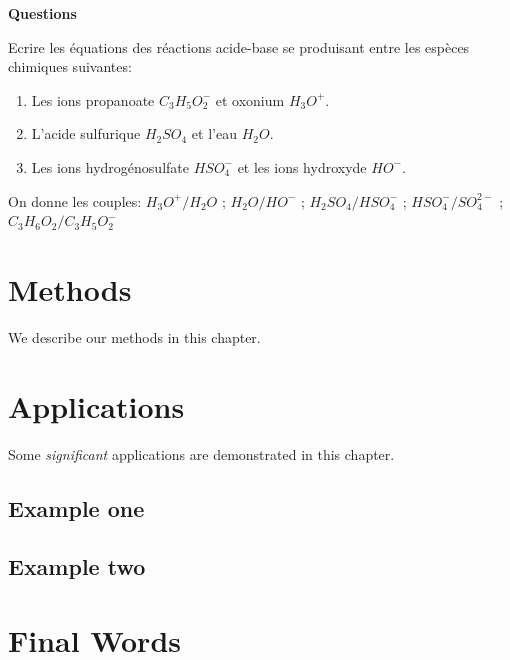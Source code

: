\documentclass[
]{book}
\providecommand{\tightlist}{%
  \setlength{\itemsep}{0pt}\setlength{\parskip}{0pt}}
\def\tightlist{}
\begin{document}
\begin{blackbox}

\begin{center}
\textbf{Questions}

\end{center}

Ecrire les équations des réactions acide-base se produisant entre les espèces chimiques suivantes:

\begin{enumerate}
\def\labelenumi{\arabic{enumi}.}
\tightlist
\item
  Les ions propanoate \(C_3H_5O_2^-\) et oxonium \(H_3O^+\).
\item
  L'acide sulfurique \(H_2SO_4\) et l'eau \(H_2O\).
\item
  Les ions hydrogénosulfate \(HSO_4^-\) et les ions hydroxyde \(HO^-\).
\end{enumerate}

On donne les couples: \(H_3O^+ / H_2O\) ; \(H_2O/HO^-\) ; \(H_2SO_4/HSO_4^-\) ; \(HSO_4^-/SO_4^{2-}\) ; \(C_3H_6O_2/C_3H_5O_2^-\)

\end{blackbox}

\hypertarget{methods}{%
\chapter{Methods}\label{methods}}

We describe our methods in this chapter.

\hypertarget{applications}{%
\chapter{Applications}\label{applications}}

Some \emph{significant} applications are demonstrated in this chapter.

\hypertarget{example-one}{%
\section{Example one}\label{example-one}}

\hypertarget{example-two}{%
\section{Example two}\label{example-two}}

\hypertarget{final-words}{%
\chapter{Final Words}\label{final-words}}
\end{document}
